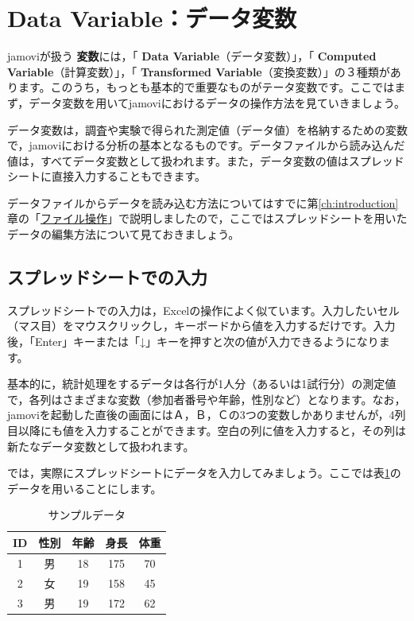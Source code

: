 \documentclass[
  12pt,
  a5jpaper,
  lualatex, ja=standard]{bxjsbook}
\renewcommand{\emph}[1]{\textbf{\color{emph} #1}}
\begin{document}
\hypertarget{sec:data-handling}{%
\section{Data Variable：データ変数}\label{sec:data-handling}}

jamoviが扱う\emph{変数}には，「\emph{Data Variable}（データ変数）」，「\emph{Computed Variable}（計算変数）」，「\emph{Transformed Variable}（変換変数）」の３種類があります。このうち，もっとも基本的で重要なものがテータ変数です。ここではまず，データ変数を用いてjamoviにおけるデータの操作方法を見ていきましょう。

データ変数は，調査や実験で得られた測定値（データ値）を格納するための変数で，jamoviにおける分析の基本となるものです。データファイルから読み込んだ値は，すべてデータ変数として扱われます。また，データ変数の値はスプレッドシートに直接入力することもできます。

データファイルからデータを読み込む方法についてはすでに第\ref{ch:introduction}章の「\protect\hyperlink{sec:intro-file}{ファイル操作}」で説明しましたので，ここではスプレッドシートを用いたデータの編集方法について見ておきましょう。

\hypertarget{sub:basics2-spreadsheet}{%
\subsection{スプレッドシートでの入力}\label{sub:basics2-spreadsheet}}

スプレッドシートでの入力は，Excelの操作によく似ています。入力したいセル（マス目）をマウスクリックし，キーボードから値を入力するだけです。入力後，「Enter」キーまたは「↓」キーを押すと次の値が入力できるようになります。

基本的に，統計処理をするデータは各行が1人分（あるいは1試行分）の測定値で，各列はさまざまな変数（参加者番号や年齢，性別など）となります。なお，jamoviを起動した直後の画面にはＡ，Ｂ，Ｃの3つの変数しかありませんが，4列目以降にも値を入力することができます。空白の列に値を入力すると，その列は新たなデータ変数として扱われます。

では，実際にスプレッドシートにデータを入力してみましょう。ここでは表\ref{tab:basics-datavariable-sampledata}のデータを用いることにします。

\begin{table}

\caption{\label{tab:basics-datavariable-sampledata}サンプルデータ}
\centering
\begin{tabular}[t]{ccccc}
\toprule
ID & 性別 & 年齢 & 身長 & 体重\\
\midrule
1 & 男 & 18 & 175 & 70\\
2 & 女 & 19 & 158 & 45\\
3 & 男 & 19 & 172 & 62\\
\bottomrule
\end{tabular}
\end{table}
\end{document}
